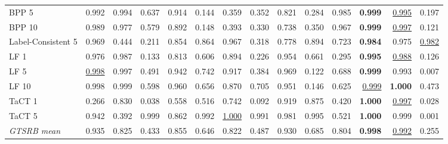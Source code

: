 \begin{table}[htbp]
\begin{adjustbox}{max width=\linewidth}
\begin{tabular}{lrrrrrrrrrrrrr}
BPP 5 & 0.992 & 0.994 & 0.637 & 0.914 & \textcolor{black!45}{0.144} & \textcolor{black!45}{0.359} & \textcolor{black!45}{0.352} & 0.821 & \textcolor{black!45}{0.284} & 0.985 & \textbf{0.999} & \underline{0.995} & \textcolor{black!45}{0.197} \\
BPP 10 & 0.989 & 0.977 & 0.579 & 0.892 & \textcolor{black!45}{0.148} & \textcolor{black!45}{0.393} & \textcolor{black!45}{0.330} & 0.738 & \textcolor{black!45}{0.350} & 0.967 & \textbf{0.999} & \underline{0.997} & \textcolor{black!45}{0.121} \\
Label-Consistent 5 & 0.969 & \textcolor{black!45}{0.444} & \textcolor{black!45}{0.211} & 0.854 & 0.864 & 0.967 & \textcolor{black!45}{0.318} & 0.778 & 0.894 & 0.723 & \textbf{0.984} & 0.975 & \underline{0.982} \\
LF 1 & 0.976 & 0.987 & \textcolor{black!45}{0.133} & 0.813 & 0.606 & 0.894 & \textcolor{black!45}{0.226} & 0.954 & 0.661 & \textcolor{black!45}{0.295} & \textbf{0.995} & \underline{0.988} & \textcolor{black!45}{0.126} \\
LF 5 & \underline{0.998} & 0.997 & \textcolor{black!45}{0.491} & 0.942 & 0.742 & 0.917 & \textcolor{black!45}{0.384} & 0.969 & \textcolor{black!45}{0.122} & 0.688 & \textbf{0.999} & 0.993 & \textcolor{black!45}{0.007} \\
LF 10 & 0.998 & 0.999 & 0.598 & 0.960 & 0.656 & 0.870 & 0.705 & 0.951 & \textcolor{black!45}{0.146} & 0.625 & \underline{0.999} & \textbf{1.000} & \textcolor{black!45}{0.473} \\
TaCT 1 & \textcolor{black!45}{0.266} & 0.830 & \textcolor{black!45}{0.038} & 0.558 & 0.516 & 0.742 & \textcolor{black!45}{0.092} & 0.919 & 0.875 & \textcolor{black!45}{0.420} & \textbf{1.000} & \underline{0.997} & \textcolor{black!45}{0.028} \\
TaCT 5 & 0.942 & \textcolor{black!45}{0.392} & 0.999 & 0.862 & 0.992 & \underline{1.000} & 0.991 & 0.981 & 0.995 & 0.521 & \textbf{1.000} & 0.999 & \textcolor{black!45}{0.001} \\
\rowcolor{black!8}\emph{GTSRB mean} & 0.935 & 0.825 & \textcolor{black!45}{0.433} & 0.855 & 0.646 & 0.822 & \textcolor{black!45}{0.487} & 0.930 & 0.685 & 0.804 & \textbf{0.998} & \underline{0.992} & \textcolor{black!45}{0.255} \\
\bottomrule
\end{tabular}
\end{adjustbox}
\end{table}
